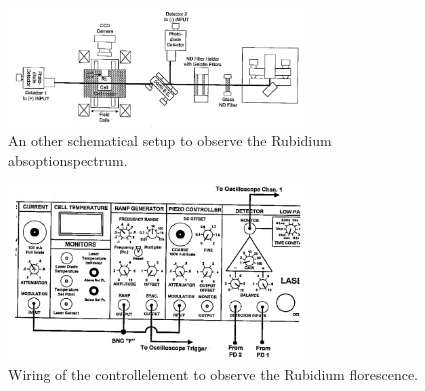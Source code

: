 \begin{figure}
  \centering
  \includegraphics[width=0.7\textwidth]{setup3.png}
  \caption{An other schematical setup to observe the Rubidium absoptionspectrum.\cite{V61}}
  \label{fig:setup3}
\end{figure}


\begin{figure}
  \centering
  \includegraphics[width=0.7\textwidth]{wiring2.png}
  \caption{Wiring of the controllelement to observe the Rubidium florescence.\cite{V61}}
  \label{fig:dl_controll2}
\end{figure}

